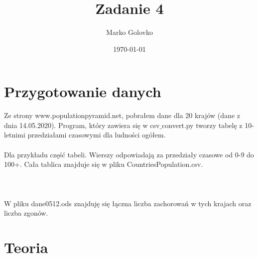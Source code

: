 \documentclass[12pt]{article}
\title{Zadanie 4}
\author{Marko Golovko}
\date{\today}
\begin{document}
\maketitle

\section*{Przygotowanie danych}
Ze strony www.populationpyramid.net, pobrałem dane dla 20 krajów (dane z dnia 14.05.2020). Program, który zawiera się w csv$\_$convert.py tworzy tabelę z 10-letnimi przedziałami czasowymi dla ludności ogółem.\\
\\
Dla przykładu część tabeli. Wierszy odpowiadają za przedziały czasowe od 0-9 do 100+. Cała tablica znajduje się w pliku CountriesPopulation.csv.
\\
\\
\\
\\
W pliku dane0512.ods znajduję się łączna liczba zachorowań w tych krajach oraz liczba zgonów.

\section*{Teoria}
\end{document}

